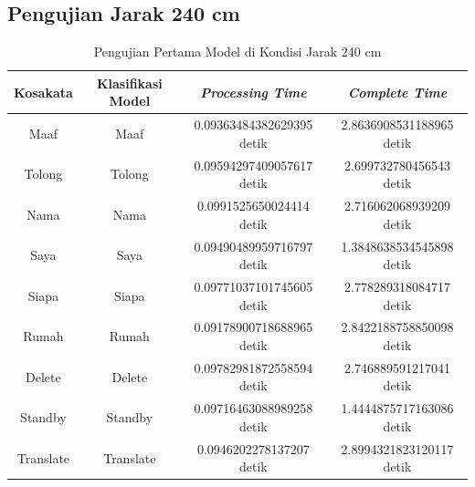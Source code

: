 \newpage
\subsection{Pengujian Jarak 240 cm}
\label{sec:analisisjarak2}

\begin{longtable}{|c|c|c|c|}
  \caption{Pengujian Pertama Model di Kondisi Jarak 240 cm}
  \label{tb:prediksitengah1}                                   \\
  \hline
  \rowcolor[HTML]{C0C0C0}
  \textbf{Kosakata} & \textbf{Klasifikasi Model} & \textbf{\emph{Processing Time}} & \textbf{\emph{Complete Time}}\\
  \hline
  Maaf              & Maaf                        & 0.09363484382629395 detik                           & 2.8636908531188965 detik                                  \\
  Tolong            & Tolong                      & 0.09594297409057617 detik                           & 2.699732780456543 detik                                \\
  Nama              & Nama                        & 0.0991525650024414 detik                            & 2.716062068939209 detik                                \\
  Saya              & Saya                        & 0.09490489959716797 detik                           & 1.3848638534545898 detik                                 \\
  Siapa             & Siapa                       & 0.09771037101745605 detik                           & 2.778289318084717 detik                                \\
  Rumah             & Rumah                       & 0.09178900718688965 detik                           & 2.8422188758850098 detik                                 \\
  Delete            & Delete                      & 0.09782981872558594 detik                           & 2.746889591217041 detik                                \\
  Standby           & Standby                     & 0.09716463088989258 detik                           & 1.4444875717163086 detik                                 \\
  Translate         & Translate                   & 0.0946202278137207 detik                            & 2.8994321823120117 detik                                 \\
  \hline
\end{longtable}

